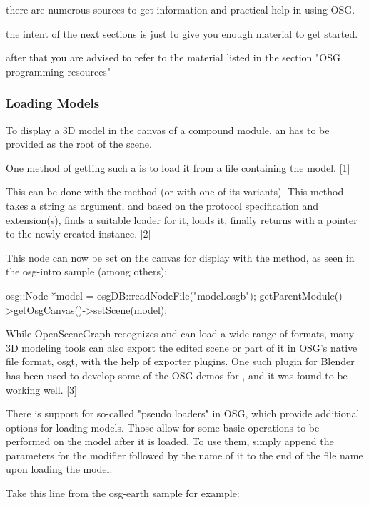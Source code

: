 there are numerous sources to get information and practical help in using OSG.

the intent of the next sections is just to give you enough material to get started.

after that you are advised to refer to the material listed in the section "OSG programming resources"

\subsubsection{Loading Models}

To display a 3D model in the canvas of a compound module, an  has
to be provided as the root of the scene.

One method of getting such a  is to load it from a file containing the
model. [1]

This can be done with the  method (or with one
of its variants). This method takes a string as argument, and based on the
protocol specification and extension(s), finds a suitable loader for it,
loads it, finally returns with a pointer to the newly created 
instance. [2]

This node can now be set on the canvas for display with the 
method, as seen in the osg-intro sample (among others):

\begin{cpp}
osg::Node *model = osgDB::readNodeFile("model.osgb");
getParentModule()->getOsgCanvas()->setScene(model);
\end{cpp}

\begin{note}
 While OpenSceneGraph recognizes and can
load a wide range of formats, many 3D modeling tools can also export the
edited scene or part of it in OSG's native file format, osgt, with the
help of exporter plugins. One such plugin for Blender has been used to
develop some of the OSG demos for {\opp}, and it was found to be working
well. [3]
\end{note}

There is support for so-called "pseudo loaders" in OSG, which provide
additional options for loading models. Those allow for some basic
operations to be performed on the model after it is loaded. To use them,
simply append the parameters for the modifier followed by the name of it to
the end of the file name upon loading the model.

Take this line from the osg-earth sample for example:

